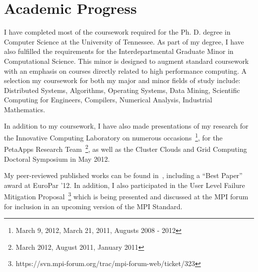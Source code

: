 \section{Academic Progress} \label{sect:academics}

I have completed most of the coursework required for the Ph. D. degree in Computer Science at the University of Tennessee. As part of my degree, I have also fulfilled the requirements for the Interdepartmental Graduate Minor in Computational Science. This minor is designed to augment standard coursework with an emphasis on courses directly related to high performance computing. A selection my coursework for both my major and minor fields of study include: Distributed Systems, Algorithms, Operating Systems, Data Mining, Scientific Computing for Engineers, Compilers, Numerical Analysis, Industrial Mathematics.

In addition to my coursework, I have also made presentations of my research for the Innovative Computing Laboratory on numerous occasions~\footnote{March 9, 2012, March 21, 2011, Augusts 2008 - 2012}, for the PetaApps Research Team~\footnote{March 2012, August 2011, January 2011}, as well as the Cluster Clouds and Grid Computing Doctoral Symposium in May 2012.

My peer-reviewed published works can be found in~\cite{Bland:CCGrid12, Bland:EuroPar12, Bland:EuroMPI12}, including a ``Best Paper'' award at EuroPar '12. In addition, I also participated in the User Level Failure Mitigation Proposal~\footnote{https://svn.mpi-forum.org/trac/mpi-forum-web/ticket/323} which is being presented and discussed at the MPI forum for inclusion in an upcoming version of the MPI Standard.